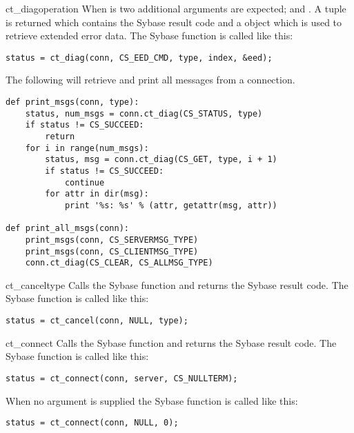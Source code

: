 \begin{methoddesc}[CS_CONNECTION]{ct_diag}{operation \optional{, \ldots}}
When  is  two additional arguments are
expected;  and .  A tuple is returned which
contains the Sybase result code and a  object which
is used to retrieve extended error data.  The Sybase
 function is called like this:

\begin{verbatim}
status = ct_diag(conn, CS_EED_CMD, type, index, &eed);
\end{verbatim}

The following will retrieve and print all messages from a connection.

\begin{verbatim}
def print_msgs(conn, type):
    status, num_msgs = conn.ct_diag(CS_STATUS, type)
    if status != CS_SUCCEED:
        return
    for i in range(num_msgs):
        status, msg = conn.ct_diag(CS_GET, type, i + 1)
        if status != CS_SUCCEED:
            continue
        for attr in dir(msg):
            print '%s: %s' % (attr, getattr(msg, attr))

def print_all_msgs(conn):
    print_msgs(conn, CS_SERVERMSG_TYPE)
    print_msgs(conn, CS_CLIENTMSG_TYPE)
    conn.ct_diag(CS_CLEAR, CS_ALLMSG_TYPE)
\end{verbatim}
\end{methoddesc}

\begin{methoddesc}[CS_CONNECTION]{ct_cancel}{type}
Calls the Sybase  function and returns the
Sybase result code.  The Sybase  function is
called like this:

\begin{verbatim}
status = ct_cancel(conn, NULL, type);
\end{verbatim}
\end{methoddesc}

\begin{methoddesc}[CS_CONNECTION]{ct_connect}{}
Calls the Sybase  function and returns the
Sybase result code.  The Sybase  function is
called like this:

\begin{verbatim}
status = ct_connect(conn, server, CS_NULLTERM);
\end{verbatim}

When no  argument is supplied the Sybase
 function is called like this:

\begin{verbatim}
status = ct_connect(conn, NULL, 0);
\end{verbatim}
\end{methoddesc}

